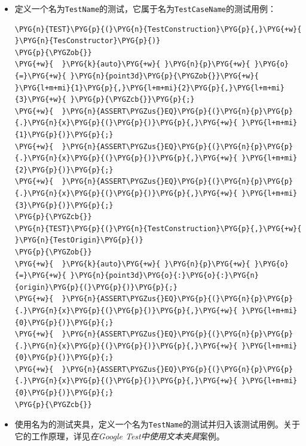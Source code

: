 \begin{itemize}
\item {}定义一个名为\texttt{TestName}的测试，它属于名为\texttt{TestCaseName}的测试用例：



\begin{codeblockbg}
\begin{Verbatim}[commandchars=\\\{\},breaklines=true,breakanywhere=true,fontsize=\codefont,xleftmargin=17bp]
\PYG{n}{TEST}\PYG{p}{(}\PYG{n}{TestConstruction}\PYG{p}{,}\PYG{+w}{ }\PYG{n}{TesConstructor}\PYG{p}{)}
\PYG{p}{\PYGZob{}}
\PYG{+w}{  }\PYG{k}{auto}\PYG{+w}{ }\PYG{n}{p}\PYG{+w}{ }\PYG{o}{=}\PYG{+w}{ }\PYG{n}{point3d}\PYG{p}{\PYGZob{}}\PYG{+w}{ }\PYG{l+m+mi}{1}\PYG{p}{,}\PYG{l+m+mi}{2}\PYG{p}{,}\PYG{l+m+mi}{3}\PYG{+w}{ }\PYG{p}{\PYGZcb{}}\PYG{p}{;}
\PYG{+w}{  }\PYG{n}{ASSERT\PYGZus{}EQ}\PYG{p}{(}\PYG{n}{p}\PYG{p}{.}\PYG{n}{x}\PYG{p}{(}\PYG{p}{)}\PYG{p}{,}\PYG{+w}{ }\PYG{l+m+mi}{1}\PYG{p}{)}\PYG{p}{;}
\PYG{+w}{  }\PYG{n}{ASSERT\PYGZus{}EQ}\PYG{p}{(}\PYG{n}{p}\PYG{p}{.}\PYG{n}{x}\PYG{p}{(}\PYG{p}{)}\PYG{p}{,}\PYG{+w}{ }\PYG{l+m+mi}{2}\PYG{p}{)}\PYG{p}{;}
\PYG{+w}{  }\PYG{n}{ASSERT\PYGZus{}EQ}\PYG{p}{(}\PYG{n}{p}\PYG{p}{.}\PYG{n}{x}\PYG{p}{(}\PYG{p}{)}\PYG{p}{,}\PYG{+w}{ }\PYG{l+m+mi}{3}\PYG{p}{)}\PYG{p}{;}
\PYG{p}{\PYGZcb{}}
\PYG{n}{TEST}\PYG{p}{(}\PYG{n}{TestConstruction}\PYG{p}{,}\PYG{+w}{ }\PYG{n}{TestOrigin}\PYG{p}{)}
\PYG{p}{\PYGZob{}}
\PYG{+w}{  }\PYG{k}{auto}\PYG{+w}{ }\PYG{n}{p}\PYG{+w}{ }\PYG{o}{=}\PYG{+w}{ }\PYG{n}{point3d}\PYG{o}{:}\PYG{o}{:}\PYG{n}{origin}\PYG{p}{(}\PYG{p}{)}\PYG{p}{;}
\PYG{+w}{  }\PYG{n}{ASSERT\PYGZus{}EQ}\PYG{p}{(}\PYG{n}{p}\PYG{p}{.}\PYG{n}{x}\PYG{p}{(}\PYG{p}{)}\PYG{p}{,}\PYG{+w}{ }\PYG{l+m+mi}{0}\PYG{p}{)}\PYG{p}{;}
\PYG{+w}{  }\PYG{n}{ASSERT\PYGZus{}EQ}\PYG{p}{(}\PYG{n}{p}\PYG{p}{.}\PYG{n}{x}\PYG{p}{(}\PYG{p}{)}\PYG{p}{,}\PYG{+w}{ }\PYG{l+m+mi}{0}\PYG{p}{)}\PYG{p}{;}
\PYG{+w}{  }\PYG{n}{ASSERT\PYGZus{}EQ}\PYG{p}{(}\PYG{n}{p}\PYG{p}{.}\PYG{n}{x}\PYG{p}{(}\PYG{p}{)}\PYG{p}{,}\PYG{+w}{ }\PYG{l+m+mi}{0}\PYG{p}{)}\PYG{p}{;}
\PYG{p}{\PYGZcb{}}
\end{Verbatim}
\end{codeblockbg}



\item {}使用名为的测试夹具，定义一个名为\texttt{TestName}的测试并归入该测试用例。关于它的工作原理，详见\textit{在Google Test中使用文本夹具}案例。

\end{itemize}


